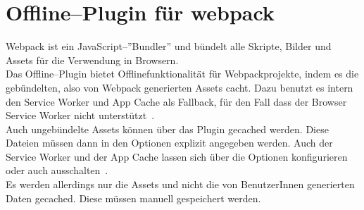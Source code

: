 \section{Offline--Plugin für webpack}
Webpack ist ein JavaScript--''Bundler'' und bündelt alle Skripte, Bilder und \gls{Assets} für die Verwendung in Browsern.\\
Das Offline--Plugin bietet Offlinefunktionalität für Webpackprojekte, indem es die gebündelten, also von Webpack generierten \gls{Assets} cacht.
Dazu benutzt es intern den Service Worker und App Cache als Fallback, für den Fall dass der Browser Service Worker nicht unterstützt~\cite{webpack-gh}.\\
Auch ungebündelte \gls{Assets} können über das Plugin gecached werden. Diese Dateien müssen dann in den Optionen explizit angegeben werden.
Auch der Service Worker und der App Cache lassen sich über die Optionen konfigurieren oder auch ausschalten~\cite{webpack-opt}.\\
Es werden allerdings nur die \gls{Assets} und nicht die von BenutzerInnen generierten Daten gecached. Diese müssen manuell gespeichert werden.